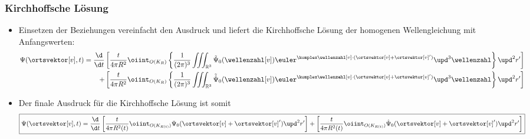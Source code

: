  \begin{frame}
  \frametitle{Kirchhoffsche Lösung}
  \begin{itemize}[<+->]
  \item Einsetzen der Beziehungen vereinfacht den Ausdruck und liefert die \alert{Kirchhoffsche Lösung} der homogenen Wellengleichung mit Anfangswerten:
    \begin{align*}
      \Psi(\ortsvektor[v], t) = \frac{\d}{\d t} &\left[ \frac{t}{4\pi R^2} \oiint_{O(K_R)} \left\{ \frac{1}{(2\pi)^3}\iiint_{\mathbb{R}^3}  \tilde{\Psi}_0(\wellenzahl[v]) \euler^{\komplex\wellenzahl[v] \cdot (\ortsvektor[v]+\ortsvektor[v]')} \upd^3\wellenzahl\right\} \upd^2 r' \right] \\
      + &\left[ \frac{t}{4\pi R^2} \oiint_{O(K_R)} \left\{ \frac{1}{(2\pi)^3}\iiint_{\mathbb{R}^3}  \tilde{\dot{\Psi}}_0(\wellenzahl[v]) \euler^{\komplex\wellenzahl[v] \cdot (\ortsvektor[v]+\ortsvektor[v]')} \upd^3\wellenzahl\right\} \upd^2 r' \right]
    \end{align*}
  \item Der finale Ausdruck für die \alert{Kirchhoffsche Lösung} ist somit
    \begin{equation*}
      \boxed{\Psi(\ortsvektor[v], t) = \frac{\d}{\d t} \left[ \frac{t}{4\pi R^2(t)} \oiint_{O(K_{R(t)})} \Psi_0(\ortsvektor[v]+\ortsvektor[v]') \upd^2 r' \right] 
      + \left[ \frac{t}{4\pi R^2(t)} \oiint_{O(K_{R(t)})} \dot{\Psi}_0(\ortsvektor[v]+\ortsvektor[v]') \upd^2 r' \right]}
    \end{equation*}
    \end{itemize}
  \end{frame}

